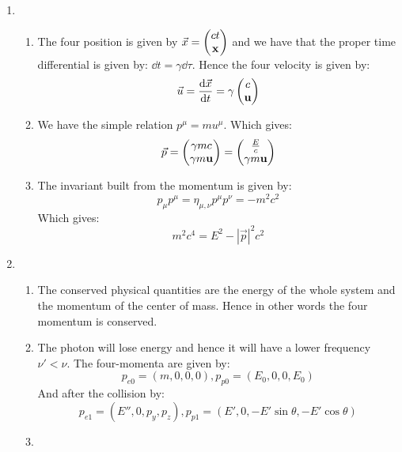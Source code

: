 \documentclass[10pt,a4paper]{book}
\begin{document}
\begin{enumerate}
\item \begin{enumerate}
\item The four position is given by $\vec{x} = \begin{pmatrix}
ct \\ \vb{x}
\end{pmatrix}$ and we have that the proper time differential is given by: $\dd t = \gamma \dd \tau$. Hence the four velocity is given by:
\[
\vec{u} = \dv{\vec{x}}{t} = \gamma  \begin{pmatrix}
c\\ \vb{u}
\end{pmatrix}
\]
\item We have the simple relation $p^\mu = m u^\mu$. Which gives:
\[
\vec{p} = \begin{pmatrix}
\gamma m c \\ \gamma m \vb{u}
\end{pmatrix} = \begin{pmatrix}
\frac{E}{c} \\ \gamma m \vb{u}
\end{pmatrix}
\]
\item The invariant built from the momentum is given by:
\[
p_\mu p^\mu = \eta_{\mu,\nu} p^\mu p^\nu = -m^2 c^2
\]
Which gives:
\[
m^2 c^4 = E^2 - |\vec{p}|^2 c^2
\]
\end{enumerate}
\item \begin{enumerate}
\item The conserved physical quantities are the energy of the whole system and the momentum of the center of mass. Hence in other words the four momentum is conserved.
\item The photon will lose energy and hence it will have a lower frequency $\nu' < \nu$. The four-momenta are given by:
\[
p_{e0} = (m, 0, 0, 0), p_{p0} = (E_0, 0, 0, E_0)
\]
And after the collision by:
\[
p_{e1} = (E'', 0, p_y, p_z), p_{p1} = (E', 0, - E' \sin\theta, - E' \cos \theta) 
\]
\item  
\end{enumerate}
\end{enumerate}
\end{document}
